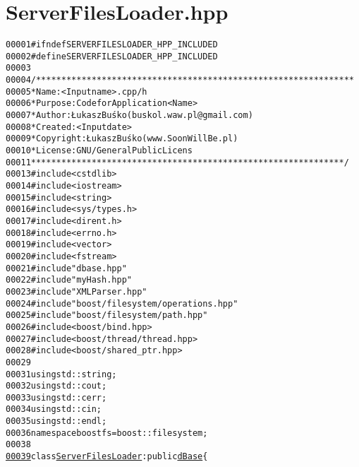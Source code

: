 \hypertarget{ServerFilesLoader_8hpp_source}{
\section{ServerFilesLoader.hpp}
}


\begin{footnotesize}\begin{alltt}
00001 \textcolor{preprocessor}{#ifndef SERVERFILESLOADER\_HPP\_INCLUDED}
00002 \textcolor{preprocessor}{}\textcolor{preprocessor}{#define SERVERFILESLOADER\_HPP\_INCLUDED}
00003 \textcolor{preprocessor}{}
00004 \textcolor{comment}{/***************************************************************}
00005 \textcolor{comment}{ * Name:      <Input name>.cpp/h}
00006 \textcolor{comment}{ * Purpose:   Code for Application <Name>}
00007 \textcolor{comment}{ * Author:    Łukasz Buśko (buskol.waw.pl@gmail.com)}
00008 \textcolor{comment}{ * Created:   <Input date>}
00009 \textcolor{comment}{ * Copyright: Łukasz Buśko (www.SoonWillBe.pl)}
00010 \textcolor{comment}{ * License:   GNU / General Public Licens}
00011 \textcolor{comment}{ **************************************************************/}
00013 \textcolor{preprocessor}{#include <cstdlib>}
00014 \textcolor{preprocessor}{#include <iostream>}
00015 \textcolor{preprocessor}{#include <string>}
00016 \textcolor{preprocessor}{#include <sys/types.h>}
00017 \textcolor{preprocessor}{#include <dirent.h>}
00018 \textcolor{preprocessor}{#include <errno.h>}
00019 \textcolor{preprocessor}{#include <vector>}
00020 \textcolor{preprocessor}{#include <fstream>}
00021 \textcolor{preprocessor}{#include "dbase.hpp"}
00022 \textcolor{preprocessor}{#include "myHash.hpp"}
00023 \textcolor{preprocessor}{#include "XMLParser.hpp"}
00024 \textcolor{preprocessor}{#include "boost/filesystem/operations.hpp"}
00025 \textcolor{preprocessor}{#include "boost/filesystem/path.hpp"}
00026 \textcolor{preprocessor}{#include <boost/bind.hpp>}
00027 \textcolor{preprocessor}{#include <boost/thread/thread.hpp>}
00028 \textcolor{preprocessor}{#include <boost/shared\_ptr.hpp>}
00029 
00031 \textcolor{keyword}{using} std::string;
00032 \textcolor{keyword}{using} std::cout;
00033 \textcolor{keyword}{using} std::cerr;
00034 \textcolor{keyword}{using} std::cin;
00035 \textcolor{keyword}{using} std::endl;
00036 \textcolor{keyword}{namespace }boostfs = boost::filesystem;
00038 
\hypertarget{ServerFilesLoader_8hpp_source_l00039}{}\hyperlink{classServerFilesLoader}{00039} \textcolor{keyword}{class }\hyperlink{classServerFilesLoader}{ServerFilesLoader}: \textcolor{keyword}{public} \hyperlink{classdBase}{dBase}\{

\end{alltt}
\end{footnotesize}
